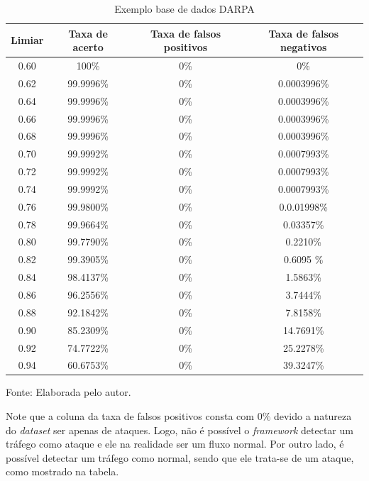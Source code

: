  \begin{table}[htb]
 	\centering
 	\begin{threeparttable}
 		\caption{Exemplo base de dados DARPA}
 		\label{Tab:ResultsMining}
 		\begin{tabular}{c c c c}
 			\toprule
 			\textbf{Limiar} & \textbf{Taxa de acerto} & \textbf{Taxa de falsos positivos} & \textbf{Taxa de falsos negativos}
 			\\ \midrule
	 			
 			0.60 &  100\% &  0\%& 0\%   \\ \midrule
 			0.62 &  99.9996\% &  0\%& 0.0003996\%   \\ \midrule
 			0.64 &  99.9996\% &  0\%& 0.0003996\%   \\ \midrule
 			0.66 &  99.9996\% &  0\%& 0.0003996\%   \\ \midrule
 			0.68 &  99.9996\% &  0\%& 0.0003996\%   \\ \midrule
 			0.70 &  99.9992\% &  0\%& 0.0007993\%   \\ \midrule
 			0.72 &  99.9992\% &  0\%& 0.0007993\%   \\ \midrule
 			0.74 &  99.9992\% &  0\%& 0.0007993\%   \\ \midrule
 			0.76 &  99.9800\% &  0\%& 0.0.01998\%   \\ \midrule
 			0.78 &  99.9664\% &  0\%& 0.03357\%   \\\midrule 		 			 			 			 			 			 			 			
 			0.80 &  99.7790\% &  0\%& 0.2210\%   \\ \midrule
 			0.82 &  99.3905\% & 0\% & 0.6095 \%   \\ \midrule
 			0.84 &  98.4137\%  & 0\% & 1.5863\%   \\ \midrule
 			0.86 &  96.2556\%  &  0\% & 3.7444\%   \\ \midrule
 			0.88 &  92.1842\%  &  0\% & 7.8158\%     \\ \midrule
 			0.90 &  85.2309\%  & 0\% & 14.7691\%    \\ \midrule
 			0.92 &  74.7722\%  &  0\% & 25.2278\%   \\ \midrule
 			0.94 &  60.6753\%  & 0\% & 39.3247\%   \\ \bottomrule
 		\end{tabular}
 		{Fonte: Elaborada pelo autor.}
 	\end{threeparttable}
 \end{table}
 Note que a coluna da taxa de falsos positivos consta com $0\%$ devido a natureza do \textit{dataset} ser apenas de ataques. Logo, não é possível o \textit{framework} detectar um tráfego como ataque e ele na realidade ser um fluxo normal. Por outro lado, é possível detectar um tráfego como normal, sendo que ele trata-se de um ataque, como mostrado na tabela.
